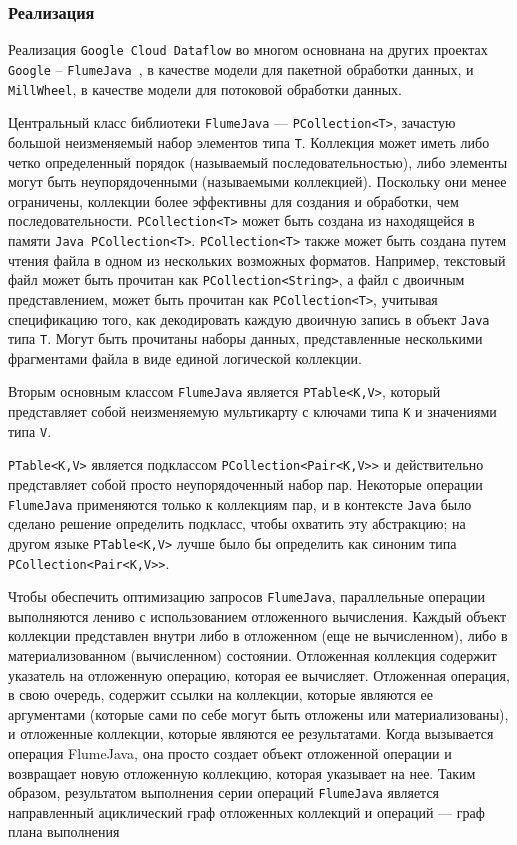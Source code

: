 \subsubsection{Реализация}

Реализация \texttt{Google Cloud Dataflow} во многом основнана на других проектах \texttt{Google} -- \texttt{FlumeJava}~\cite{flumejava}, в качестве модели для пакетной обработки данных, и \texttt{MillWheel}, в качестве модели для потоковой обработки данных.

Центральный класс библиотеки \texttt{FlumeJava} --- \texttt{PCollection<T>}, зачастую большой неизменяемый набор элементов типа \texttt{T}. Коллекция может иметь либо четко определенный порядок (называемый последовательностью), либо элементы могут быть неупорядоченными (называемыми коллекцией). Поскольку они менее ограничены, коллекции более эффективны для создания и обработки, чем последовательности. \texttt{PCollection<T>} может быть создана из находящейся в памяти \texttt{Java PCollection<T>}. \texttt{PCollection<T>} также может быть создана путем чтения файла в одном из нескольких возможных форматов. Например, текстовый файл может быть прочитан как \texttt{PCollection<String>}, а файл с двоичным представлением, может быть прочитан как \texttt{PCollection<T>}, учитывая спецификацию того, как декодировать каждую двоичную запись в объект \texttt{Java} типа \texttt{T}. Могут быть прочитаны наборы данных, представленные несколькими фрагментами файла в виде единой логической коллекции.

Вторым основным классом \texttt{FlumeJava} является \texttt{PTable<K,V>}, который представляет собой неизменяемую мультикарту с ключами типа \texttt{K} и значениями типа \texttt{V}. 

\texttt{PTable<K,V>} является подклассом \texttt{PCollection<Pair<K,V>>} и действительно представляет собой просто неупорядоченный набор пар. Некоторые операции \texttt{FlumeJava} применяются только к коллекциям пар, и в контексте \texttt{Java} было сделано решение определить подкласс, чтобы охватить эту абстракцию; на другом языке \texttt{PTable<K,V>} лучше было бы определить как синоним типа \texttt{PCollection<Pair<K,V>>}.

Чтобы обеспечить оптимизацию запросов \texttt{FlumeJava}, параллельные операции  выполняются лениво с использованием отложенного вычисления. 
Каждый объект коллекции представлен внутри либо в отложенном (еще не вычисленном), либо в материализованном (вычисленном) состоянии. 
Отложенная коллекция содержит указатель на отложенную операцию, которая ее вычисляет. 
Отложенная операция, в свою очередь, содержит ссылки на коллекции, которые являются ее аргументами (которые сами по себе могут быть отложены или материализованы), и отложенные коллекции, которые являются ее результатами. Когда вызывается операция FlumeJava, она просто создает объект отложенной операции и возвращает новую отложенную коллекцию, которая указывает на нее. 
Таким образом, результатом выполнения серии операций \texttt{FlumeJava} является направленный ациклический граф отложенных коллекций и операций --- граф плана выполнения

